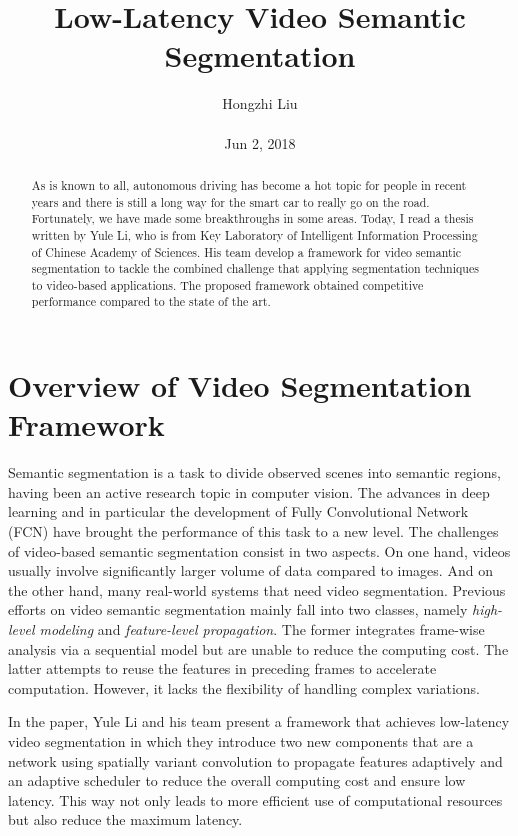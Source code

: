\documentclass[10pt,twocolumn,letterpaper]{article}
\title{Low-Latency Video Semantic Segmentation}
\author{Hongzhi Liu\\\\
Jun 2, 2018}
\begin{document}
\maketitle
\begin{abstract}
	As is known to all, autonomous driving has become a hot topic for people in recent years and there is still a long way for the smart car to really go on the road. Fortunately, we have made some breakthroughs in some areas. Today, I read a thesis written by Yule Li, who is from Key Laboratory of Intelligent Information Processing of Chinese Academy of Sciences. His team develop a framework for video semantic segmentation to tackle the combined challenge that applying segmentation techniques to video-based applications. The proposed framework obtained competitive performance compared to the state of the art.

\end{abstract}
\section{Overview of Video Segmentation Framework}

Semantic segmentation is a task to divide observed scenes into semantic regions, having been an active research topic in computer vision. The advances in deep learning \cite{Krizhevsky2012ImageNet}  and in particular the development of Fully Convolutional Network (FCN) \cite{Long2015Fully} have brought the performance of this task to a new level. The challenges of video-based semantic segmentation consist in two aspects. On one hand, videos usually involve significantly larger volume of data compared to images. And on the other hand, many real-world systems that need video segmentation. Previous efforts on video semantic segmentation mainly fall into two classes, namely \emph{high-level modeling} and \emph{feature-level propagation}. The former \cite{fayyaz2016stfcn} integrates frame-wise analysis via a sequential model but are unable to reduce the computing cost. The latter attempts to reuse the features in preceding frames to accelerate computation. However, it lacks the flexibility of handling complex variations.

In the paper, Yule Li and his team present a framework that achieves low-latency video segmentation \cite{li2018low} in which they introduce two new components that are a network using spatially variant convolution to propagate features adaptively and an adaptive scheduler to reduce the overall computing cost and ensure low latency. This way not only leads to more efficient use of computational resources but also reduce the maximum latency.
\end{document}
